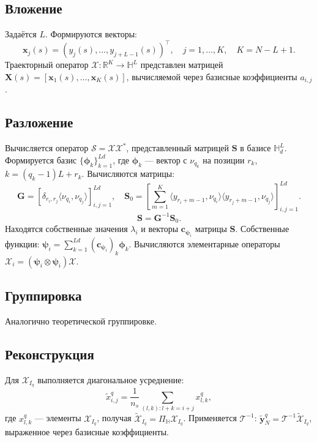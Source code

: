 \documentclass[12pt, specialist, subf
]{disser}
\theoremstyle{definition}
\begin{document}
\subsection*{Вложение}
    Задаётся \( L\). Формируются векторы:
    \[
    \mathbf{x}_j(s) = (y_j(s), \dots, y_{j+L-1}(s))^\top, \quad j=1,\dots,K, \quad K=N-L+1.
    \]
    Траекторный оператор \( \mathcal{X}: \mathbb{R}^K \to \mathbb{H}^L \) представлен матрицей \( \mathbf{X}(s) = [\mathbf{x}_1(s), \dots, \mathbf{x}_K(s)] \), вычисляемой через базисные коэффициенты \( a_{i,j} \).

\subsection*{Разложение}

    Вычисляется оператор \( \mathcal{S} = \mathcal{X} \mathcal{X}^* \), представленный матрицей \( \mathbf{S} \) в базисе \( \mathbb{H}_d^L \). Формируется базис \( \{\mathbf{\phi}_k\}_{k=1}^{Ld} \), где \( \mathbf{\phi}_k \) — вектор с \( \nu_{q_k} \) на позиции \( r_k \), \( k = (q_k-1)L + r_k \). Вычисляются матрицы:
    \[
    \mathbf{G} = [\delta_{r_i,r_j} \langle \nu_{q_i}, \nu_{q_j} \rangle]_{i,j=1}^{Ld}, \quad \mathbf{S}_0 = \left[\sum_{m=1}^K \langle y_{r_i+m-1}, \nu_{q_i} \rangle \langle y_{r_j+m-1}, \nu_{q_j} \rangle\right]_{i,j=1}^{Ld}.
    \]
    \[
    \mathbf{S} = \mathbf{G}^{-1} \mathbf{S}_0.
    \]
    Находятся собственные значения \( \lambda_i \) и векторы \( \mathbf{c}_{\mathbf{\psi}_i} \) матрицы \( \mathbf{S} \). Собственные функции: \( \mathbf{\psi}_i = \sum_{k=1}^{Ld} (\mathbf{c}_{\mathbf{\psi}_i})_k \mathbf{\phi}_k \). Вычисляются элементарные операторы \( \mathcal{X}_i = (\mathbf{\psi}_i \otimes \mathbf{\psi}_i) \mathcal{X} \).

	\subsection*{Группировка}
    Аналогично теоретической группировке.

	\subsection*{Реконструкция}
    Для \( \mathcal{X}_{I_q} \) выполняется диагональное усреднение:
    \[
    \tilde{x}_{i,j}^q = \frac{1}{n_s} \sum_{(l,k): l+k=i+j} x_{l,k}^q,
    \]
    где \( x_{l,k}^q \) — элементы \( \mathcal{X}_{I_q} \), получая \( \tilde{\mathcal{X}}_{I_q} = \Pi_\mathbb{H} \mathcal{X}_{I_q} \). Применяется \( \mathcal{T}^{-1} \): \( \tilde{\mathbf{y}}_N^q = \mathcal{T}^{-1} \tilde{\mathcal{X}}_{I_q} \), выраженное через базисные коэффициенты.
\end{document}
